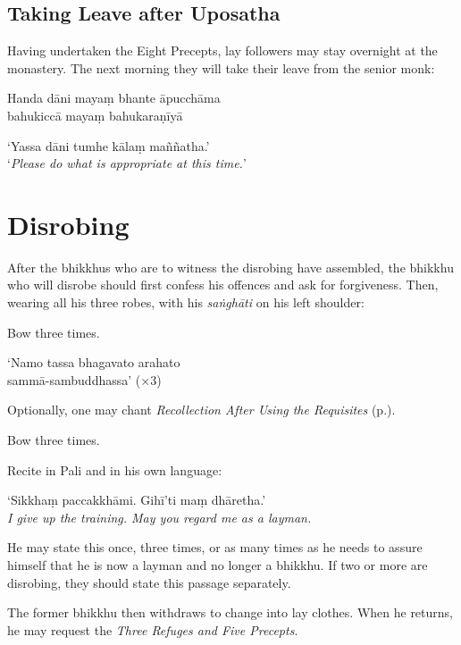 \subsection{Taking Leave after Uposatha}

Having undertaken the Eight Precepts, lay followers may stay overnight at the monastery. The next
morning they will take their leave from the senior monk:


Handa dāni mayaṃ bhante āpucchāma\\
bahukiccā mayaṃ bahukaraṇīyā


‘Yassa dāni tumhe kālaṃ maññatha.’\\
‘\emph{Please do what is appropriate at this time.}’

\section{Disrobing}

After the bhikkhus who are to witness the disrobing have assembled, the bhikkhu
who will disrobe should first confess his offences and ask for forgiveness. Then, wearing all his three
robes, with his \emph{saṅghāti} on his left shoulder:

Bow three times.

‘Namo tassa bhagavato arahato\\
sammā-sambuddhassa’ (×3)

Optionally, one may chant \emph{Recollection After Using the Requisites}
(p.\pageref{recollection-after-using}).

Bow three times.

Recite in Pali and in his own language:

‘Sikkhaṃ paccakkhāmi. Gihī'ti maṃ dhāretha.’\\
\emph{I give up the training. May you regard me as a layman.}

He may state this once, three times, or as many times as he needs to assure
himself that he is now a layman and no longer a bhikkhu. If two or more are
disrobing, they should state this passage separately.

The former bhikkhu then withdraws to change into lay clothes. When he returns,
he may request the \emph{Three Refuges and Five Precepts}.

